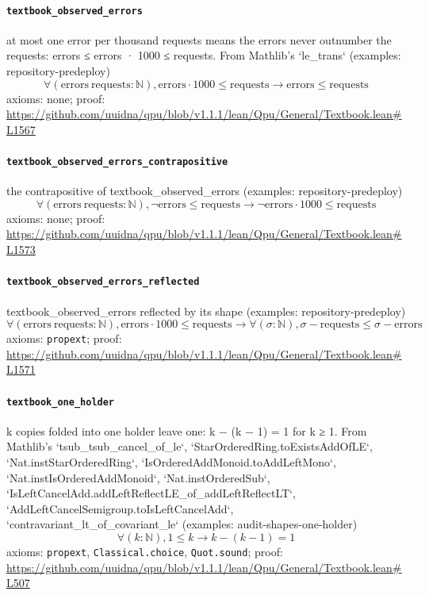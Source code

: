 \documentclass[11pt]{article}
\begin{document}
\paragraph{\texttt{textbook\_observed\_errors}}
at most one error per thousand requests means the errors never outnumber the requests: errors ≤ errors · 1000 ≤ requests. From Mathlib's `le\_trans` (examples: repository-predeploy)
\[ \forall (\mathrm{errors}\ \mathrm{requests} : \mathbb{N}), \mathrm{errors} \cdot 1000 \le \mathrm{requests} \to \mathrm{errors} \le \mathrm{requests} \]
\noindent axioms: none; proof: \url{https://github.com/uuidna/qpu/blob/v1.1.1/lean/Qpu/General/Textbook.lean\#L1567}

\paragraph{\texttt{textbook\_observed\_errors\_contrapositive}}
the contrapositive of textbook\_observed\_errors (examples: repository-predeploy)
\[ \forall (\mathrm{errors}\ \mathrm{requests} : \mathbb{N}), \neg \mathrm{errors} \le \mathrm{requests} \to \neg \mathrm{errors} \cdot 1000 \le \mathrm{requests} \]
\noindent axioms: none; proof: \url{https://github.com/uuidna/qpu/blob/v1.1.1/lean/Qpu/General/Textbook.lean\#L1573}

\paragraph{\texttt{textbook\_observed\_errors\_reflected}}
textbook\_observed\_errors reflected by its shape (examples: repository-predeploy)
\[ \forall (\mathrm{errors}\ \mathrm{requests} : \mathbb{N}), \mathrm{errors} \cdot 1000 \le \mathrm{requests} \to \forall (\sigma : \mathbb{N}), \sigma - \mathrm{requests} \le \sigma - \mathrm{errors} \]
\noindent axioms: \texttt{propext}; proof: \url{https://github.com/uuidna/qpu/blob/v1.1.1/lean/Qpu/General/Textbook.lean\#L1571}

\paragraph{\texttt{textbook\_one\_holder}}
k copies folded into one holder leave one: k − (k − 1) = 1 for k ≥ 1. From Mathlib's `tsub\_tsub\_cancel\_of\_le`, `StarOrderedRing.toExistsAddOfLE`, `Nat.instStarOrderedRing`, `IsOrderedAddMonoid.toAddLeftMono`, `Nat.instIsOrderedAddMonoid`, `Nat.instOrderedSub`, `IsLeftCancelAdd.addLeftReflectLE\_of\_addLeftReflectLT`, `AddLeftCancelSemigroup.toIsLeftCancelAdd`, `contravariant\_lt\_of\_covariant\_le` (examples: audit-shapes-one-holder)
\[ \forall (k : \mathbb{N}), 1 \le k \to k - (k - 1) = 1 \]
\noindent axioms: \texttt{propext}, \texttt{Classical.choice}, \texttt{Quot.sound}; proof: \url{https://github.com/uuidna/qpu/blob/v1.1.1/lean/Qpu/General/Textbook.lean\#L507}
\end{document}
